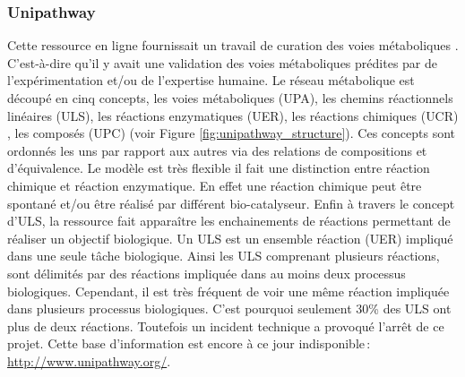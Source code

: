 \begin{refsegment}
    \subsubsection{Unipathway}
    
    Cette ressource en ligne fournissait un travail de curation des voies métaboliques \cite{morgat2011unipathway}. C'est-à-dire qu'il y avait une validation des voies métaboliques prédites par de l'expérimentation et/ou de l'expertise humaine. Le réseau métabolique est découpé en cinq concepts, les voies métaboliques (\gls{UPA}), les chemins réactionnels linéaires (\gls{ULS}), les réactions enzymatiques (\gls{UER}), les réactions chimiques (\gls{UCR}) , les composés (\gls{UPC}) (voir Figure \ref{fig:unipathway_structure}). Ces concepts sont ordonnés les uns par rapport aux autres via des relations de compositions et d'équivalence. Le modèle est très flexible il fait une distinction entre réaction chimique et réaction enzymatique. En effet une réaction chimique peut être spontané et/ou être réalisé par différent bio-catalyseur. Enfin à travers le concept d'\gls{ULS}, la ressource fait apparaître les enchainements de réactions permettant de réaliser un objectif biologique. Un \gls{ULS} est un ensemble réaction (\gls{UER}) impliqué dans une seule tâche biologique. Ainsi les \gls{ULS} comprenant plusieurs réactions, sont délimités par des réactions impliquée dans au moins deux processus biologiques. Cependant, il est très fréquent de voir une même réaction impliquée dans plusieurs processus biologiques. C'est pourquoi seulement 30\% des \gls{ULS} ont plus de deux réactions. Toutefois un incident technique a provoqué l'arrêt de ce projet. Cette base d'information est encore à ce jour indisponible : \url{http://www.unipathway.org/}.
    
    

\end{refsegment}
